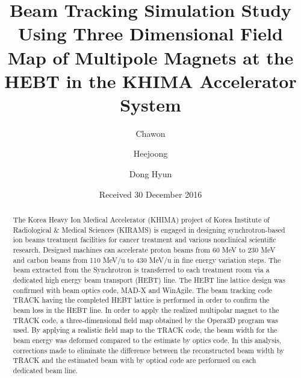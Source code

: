 \documentclass[jkps,preprint,fleqn,showpacs,showkeys]{revtex4}
\begin{document}
\setcounter{page}{1}
\title[]{Beam Tracking Simulation Study Using Three Dimensional Field Map of Multipole Magnets at the HEBT in the KHIMA Accelerator System}
\author{Chawon }
\author{Heejoong }
\author{Dong Hyun }
\date[]{Received 30 December 2016}
\begin{abstract}
  The Korea Heavy Ion Medical Accelerator (KHIMA) project of Korea Institute of Radiological \& Medical Sciences (KIRAMS) is engaged in
  designing synchrotron-based ion beams treatment facilities for cancer treatment and various nonclinical scientific research.
  Designed machines can accelerate proton beams from 60 MeV to 230 MeV
  and carbon beams from 110 MeV/u to 430 MeV/u in fine energy variation steps.
  The beam extracted from the Synchrotron is transferred to each treatment room via a dedicated high energy beam transport (HEBT) line.
  The HEBT line lattice design was confirmed with beam optics code, MAD-X and WinAgile.  
  The beam tracking code TRACK having the completed HEBT lattice is performed in order to confirm the beam loss in the HEBT line.  
  In order to apply the realized multipolar magnet to the TRACK code, a three-dimensional field map obtained by the Opera3D program was used.
  By applying a realistic field map to the TRACK code,  
  the beam width for the beam energy was deformed compared to the estimate by optics code.
  In this analysis, corrections made to eliminate the difference between the reconstructed beam width by TRACK
  and the estimated beam with by optical code are performed on each dedicated beam line.
\end{abstract}


\maketitle
\end{document}
